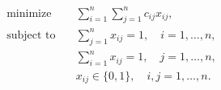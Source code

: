 \begin{align*}
\text{minimize} \quad & \sum_{i=1}^n \sum_{j=1}^n c_{ij} x_{ij}, \\
\text{subject to} \quad & \sum_{j=1}^n x_{ij} = 1, \quad i = 1, \ldots, n,  \\
& \sum_{i=1}^n x_{ij} = 1, \quad j = 1, \ldots, n,  \\
& x_{ij} \in \lbrace 0, 1 \rbrace, \quad i,j = 1, \ldots,n.
\end{align*}

